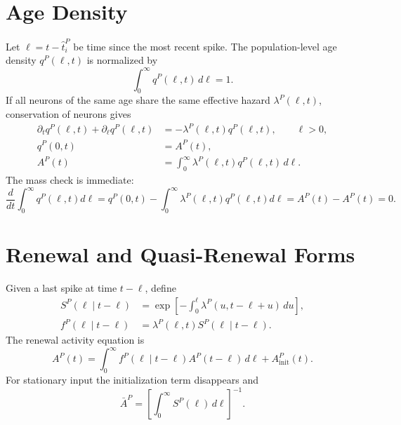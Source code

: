 \section{Age Density}

Let \(\ell=t-\hat t_i^P\) be time since the most recent spike. The
population-level age density \(q^P(\ell,t)\) is normalized by
\begin{equation}
  \int_0^\infty q^P(\ell,t)\,d\ell=1.
  \label{eq:appA-age-normalization}
\end{equation}
If all neurons of the same age share the same effective hazard
\(\lambda^P(\ell,t)\), conservation of neurons gives
\begin{align}
  \partial_t q^P(\ell,t)+\partial_\ell q^P(\ell,t)
  &=
  -\lambda^P(\ell,t)q^P(\ell,t),
  \qquad \ell>0,
  \label{eq:appA-age-pde}
  \\
  q^P(0,t)
  &=
  A^P(t),
  \label{eq:appA-age-boundary}
  \\
  A^P(t)
  &=
  \int_0^\infty
  \lambda^P(\ell,t)q^P(\ell,t)\,d\ell.
  \label{eq:appA-age-activity}
\end{align}
The mass check is immediate:
\[
  \frac{d}{dt}\int_0^\infty q^P(\ell,t)d\ell
  =
  q^P(0,t)-\int_0^\infty\lambda^P(\ell,t)q^P(\ell,t)d\ell
  =
  A^P(t)-A^P(t)=0.
\]

\section{Renewal and Quasi-Renewal Forms}

Given a last spike at time \(t-\ell\), define
\begin{align}
  S^P(\ell\mid t-\ell)
  &=
  \exp\!\left[
    -\int_0^\ell \lambda^P(u,t-\ell+u)\,du
  \right],
  \label{eq:appA-survival}
  \\
  f^P(\ell\mid t-\ell)
  &=
  \lambda^P(\ell,t)S^P(\ell\mid t-\ell).
  \label{eq:appA-isi-density}
\end{align}
The renewal activity equation is
\begin{equation}
  A^P(t)
  =
  \int_0^\infty
  f^P(\ell\mid t-\ell)A^P(t-\ell)\,d\ell
  + A_{\mathrm{init}}^P(t).
  \label{eq:appA-renewal}
\end{equation}
For stationary input the initialization term disappears and
\begin{equation}
  \bar A^P
  =
  \left[\int_0^\infty S^P(\ell)\,d\ell\right]^{-1}.
  \label{eq:appA-stationary-rate}
\end{equation}

